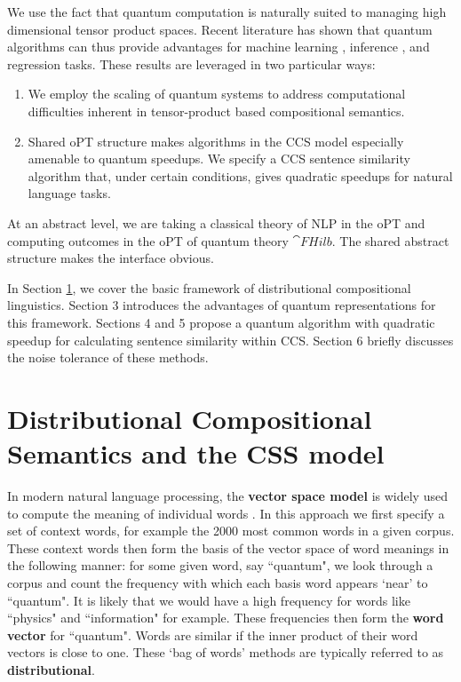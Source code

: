We use the fact that quantum computation is naturally suited to managing high dimensional tensor product spaces. Recent literature has shown that quantum algorithms can thus provide advantages for machine learning \cite{wiebe2014quantum,rebentrost2014quantum}, inference \cite{low2014quantum}, and regression \cite{wiebe2012quantum,wang2014quantum} tasks.  These results are leveraged in two particular ways:
\begin{enumerate}
\item We employ the scaling of quantum systems to address computational difficulties  inherent in tensor-product based compositional semantics.
\item Shared oPT structure makes algorithms in the CCS model especially amenable to quantum speedups.  We specify a CCS sentence similarity algorithm that, under certain conditions, gives quadratic speedups for natural language tasks.
\end{enumerate}
At an abstract level, we are taking a classical theory of NLP in the oPT  and computing outcomes in the oPT of quantum theory $\cat{FHilb}$. The shared abstract structure makes the interface obvious.

In Section \ref{sec:disco}, we cover the basic framework of distributional compositional linguistics. Section 3 introduces the advantages of quantum representations for this framework.  Sections 4 and 5 propose a quantum algorithm with quadratic speedup for calculating sentence similarity within CCS. Section 6 briefly discusses the noise tolerance of these methods.

\section{Distributional Compositional Semantics and the CSS model}
\label{sec:disco}
In modern natural language processing, the \textbf{vector space model} is widely used to compute the meaning of individual words \cite{schutze1998automatic}. In this approach we first specify a set of context words, for example the 2000 most common words in a given corpus.  These context words then form the basis of the vector space of word meanings in the following manner: for some given word, say  ``quantum", we look through a corpus and count the frequency with which each basis word    appears `near' to ``quantum". It is likely that we would have a high frequency for words like ``physics" and ``information" for example.  These frequencies then form the \textbf{word vector} for ``quantum". Words are similar if the inner product of their word vectors is close to one. These `bag of words' methods are typically referred to as \textbf{distributional}.

